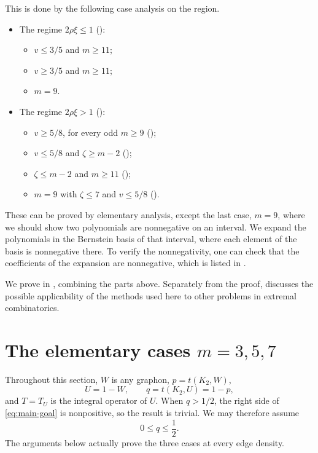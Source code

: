 \documentclass[11pt]{article}
\numberwithin{equation}{section}
\begin{document}
\begin{enumerate}[label=\textbf{Section \arabic*.},leftmargin=4.6em,start=2]
  This is done by the following case analysis on the region.
  \begin{itemize}[leftmargin=1.6em,topsep=2pt,itemsep=1pt]
    \item The regime $2\rho\xi\le1$ ():
    \begin{itemize}[leftmargin=1.4em,topsep=1pt,itemsep=0pt]
      \item $v\le3/5$ and $m\ge11$;
      \item $v\ge3/5$ and $m\ge11$;
      \item $m=9$.
    \end{itemize}
    \item The regime $2\rho\xi>1$ ():
    \begin{itemize}[leftmargin=1.4em,topsep=1pt,itemsep=0pt]
      \item $v\ge5/8$, for every odd $m\ge9$ ();
      \item $v\le5/8$ and $\zeta\ge m-2$ ();
      \item $\zeta\le m-2$ and $m\ge11$ ();
      \item $m=9$ with $\zeta\le7$ and $v\le5/8$ ().
    \end{itemize}
  \end{itemize}
  These can be proved by elementary analysis, except the last case, $m=9$, where we should show two polynomials are nonnegative on an interval.
  We expand the polynomials in the Bernstein basis of that interval, where each element of the basis is nonnegative there.
  To verify the nonnegativity, one can check that the coefficients of the expansion are nonnegative, which is listed in .
\end{enumerate}

We prove  in , combining the parts above.
Separately from the proof,  discusses the possible applicability of the methods used here to other problems in extremal combinatorics.

\section{The elementary cases \texorpdfstring{$m=3,5,7$}{m=3,5,7}}\label{sec:short-cycles}

Throughout this section, $W$ is any graphon, $p=t(K_2,W)$,
\[
  U=1-W,\qquad q=t(K_2,U)=1-p,
\]
and $T=T_U$ is the integral operator of $U$.
When $q>1/2$, the right side of \eqref{eq:main-goal} is nonpositive, so the result is trivial.
We may therefore assume
\begin{equation}\label{eq:q-short}
  0\le q\le\frac{1}{2}.
\end{equation}
The arguments below actually prove the three cases at every edge density.
\end{document}
